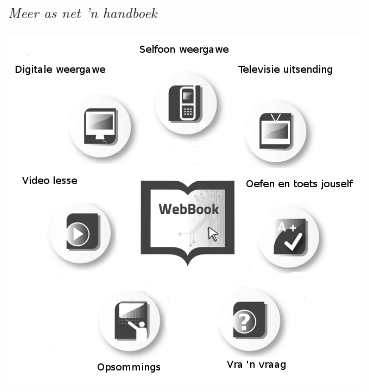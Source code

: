 
\newpage
\thispagestyle{empty}

{\normalfont\sffamily\fontsize{22}\normalfont\itshape Meer as net 'n handboek} \par

\begin{center}
\includegraphics[width=0.70\textwidth]{../title_images/morethantextbookAfrikaans.png}
\end{center}

